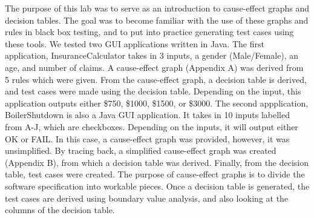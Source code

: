 The purpose of this lab was to serve as an introduction to cause-effect graphs
and decision tables. The goal was to become familiar with the use of these
graphs and rules in black box testing, and to put into practice generating test
cases using these tools. We tested two GUI applications written in Java.
The first application, InsuranceCalculator takes in 3 inputs, a gender
(Male/Female), an age, and number of claims. A cause-effect graph (Appendix A)
was derived from 5 rules which were given. From the cause-effect graph, a
decision table is derived, and test cases were made using the decision table.
Depending on the input, this application outputs either \$750, \$1000, \$1500,
or \$3000. The second appplication, BoilerShutdown is also a Java GUI
application. It takes in 10 inputs labelled from A-J, which are checkboxes.
Depending on the inputs, it will output either OK or FAIL. In this case, a
cause-effect graph was provided, however, it was unsimplified. By tracing back,
a simplified cause-effect graph was created (Appendix B), from which a decision
table was derived. Finally, from the decision table, test cases were created.
The purpose of cause-effect graphs is to divide the software specification into
workable pieces. Once a decision table is generated, the test cases are derived
using boundary value analysis, and also looking at the columns of the decision
table. 
